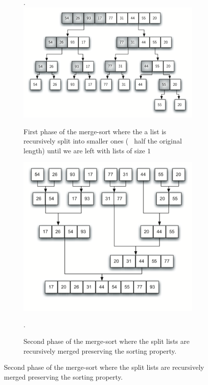 \begin{figure}
	\centering
	\begin{subfigure}[t]{0.80\textwidth}
		\caption[]{First phase of the merge-sort where the a list is recursively split into smaller ones (~ half the original length) until we are left with lists of size $1$}.
		\label{fig:merge_k_sorted_lists:example_mergesort}
		\includegraphics[width=\textwidth]{sources/merge_k_sorted_lists/images/mergesort_example}
	 \end{subfigure}
	\hfill
	\begin{subfigure}[t]{0.80\textwidth}
		\includegraphics[width=\textwidth]{sources/merge_k_sorted_lists/images/mergesort_example_1}
		\caption[]{Second phase of the merge-sort where the split lists are recursively merged preserving the sorting property.}.
		\label{fig:merge_k_sorted_lists:example_mergesort_1}
	 \end{subfigure}
\end{figure}

